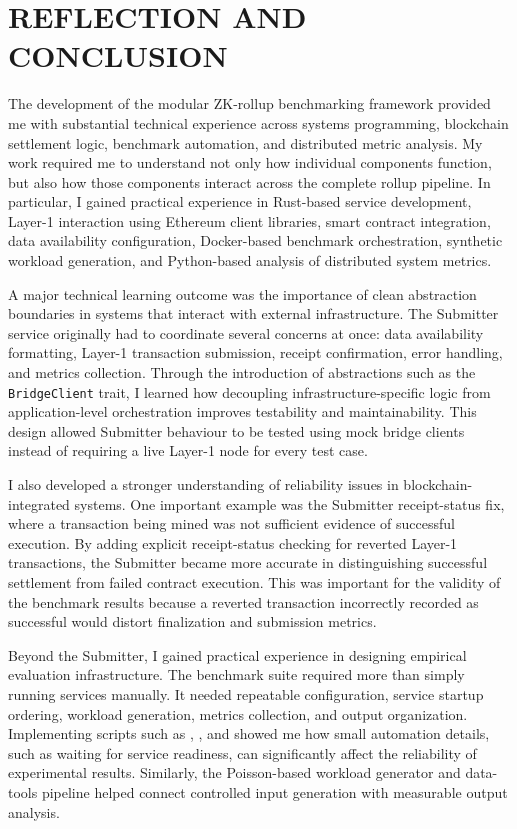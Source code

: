 \chapter{REFLECTION AND CONCLUSION}

The development of the modular ZK-rollup benchmarking framework provided me with substantial technical experience across systems programming, blockchain settlement logic, benchmark automation, and distributed metric analysis. My work required me to understand not only how individual components function, but also how those components interact across the complete rollup pipeline. In particular, I gained practical experience in Rust-based service development, Layer-1 interaction using Ethereum client libraries, smart contract integration, data availability configuration, Docker-based benchmark orchestration, synthetic workload generation, and Python-based analysis of distributed system metrics.

A major technical learning outcome was the importance of clean abstraction boundaries in systems that interact with external infrastructure. The Submitter service originally had to coordinate several concerns at once: data availability formatting, Layer-1 transaction submission, receipt confirmation, error handling, and metrics collection. Through the introduction of abstractions such as the \texttt{BridgeClient} trait, I learned how decoupling infrastructure-specific logic from application-level orchestration improves testability and maintainability. This design allowed Submitter behaviour to be tested using mock bridge clients instead of requiring a live Layer-1 node for every test case.

I also developed a stronger understanding of reliability issues in blockchain-integrated systems. One important example was the Submitter receipt-status fix, where a transaction being mined was not sufficient evidence of successful execution. By adding explicit receipt-status checking for reverted Layer-1 transactions, the Submitter became more accurate in distinguishing successful settlement from failed contract execution. This was important for the validity of the benchmark results because a reverted transaction incorrectly recorded as successful would distort finalization and submission metrics.

Beyond the Submitter, I gained practical experience in designing empirical evaluation infrastructure. The benchmark suite required more than simply running services manually. It needed repeatable configuration, service startup ordering, workload generation, metrics collection, and output organization. Implementing scripts such as , , and  showed me how small automation details, such as waiting for service readiness, can significantly affect the reliability of experimental results. Similarly, the Poisson-based workload generator and data-tools pipeline helped connect controlled input generation with measurable output analysis.

